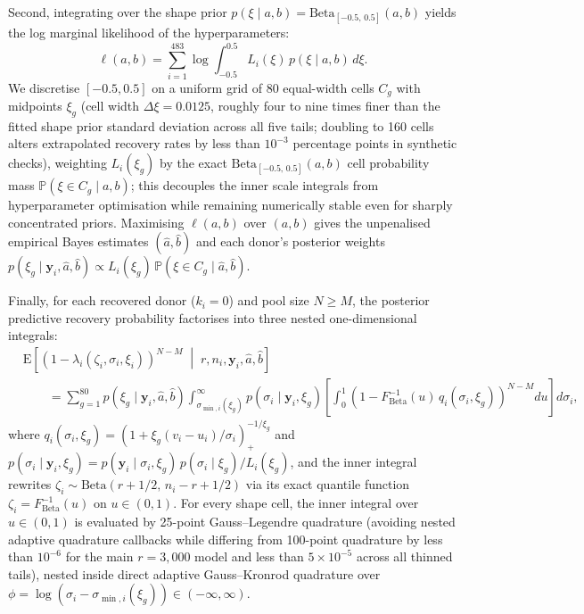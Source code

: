 \documentclass[11pt,a4paper]{article}
\begin{document}
Second, integrating over the shape prior $p(\xi \mid a, b) = \mathrm{Beta}_{[-0.5,\,0.5]}(a, b)$ yields the log marginal likelihood of the hyperparameters:
\[
    \ell(a, b) = \sum_{i=1}^{483} \log \int_{-0.5}^{0.5} L_i(\xi)\, p(\xi \mid a, b)\, d\xi.
\]
We discretise $[-0.5, 0.5]$ on a uniform grid of 80 equal-width cells $C_g$ with midpoints $\xi_g$ (cell width $\Delta\xi = 0.0125$, roughly four to nine times finer than the fitted shape prior standard deviation across all five tails; doubling to 160 cells alters extrapolated recovery rates by less than $10^{-3}$ percentage points in synthetic checks), weighting $L_i(\xi_g)$ by the exact $\mathrm{Beta}_{[-0.5,\,0.5]}(a, b)$ cell probability mass $\mathbb{P}(\xi \in C_g \mid a, b)$; this decouples the inner scale integrals from hyperparameter optimisation while remaining numerically stable even for sharply concentrated priors. Maximising $\ell(a, b)$ over $(a, b)$ gives the unpenalised empirical Bayes estimates $(\hat{a}, \hat{b})$ and each donor's posterior weights $p(\xi_g \mid \mathbf{y}_i, \hat{a}, \hat{b}) \propto L_i(\xi_g)\,\mathbb{P}(\xi \in C_g \mid \hat{a}, \hat{b})$.

Finally, for each recovered donor ($k_i = 0$) and pool size $N \ge M$, the posterior predictive recovery probability factorises into three nested one-dimensional integrals:
\begin{align*}
    &\mathrm{E}\!\left[\left(1 - \lambda_i(\zeta_i, \sigma_i, \xi_i)\right)^{N - M} \;\middle|\; r, n_i, \mathbf{y}_i, \hat{a}, \hat{b}\right] \\
    &\qquad = \sum_{g=1}^{80} p(\xi_g \mid \mathbf{y}_i, \hat{a}, \hat{b}) \int_{\sigma_{\min,i}(\xi_g)}^{\infty} p(\sigma_i \mid \mathbf{y}_i, \xi_g) \left[\int_{0}^{1} \left(1 - F_{\mathrm{Beta}}^{-1}(u)\, q_i(\sigma_i, \xi_g)\right)^{N - M}\! du\right] d\sigma_i,
\end{align*}
where $q_i(\sigma_i, \xi_g) = (1 + \xi_g (v_i - u_i)/\sigma_i)_{+}^{-1/\xi_g}$ and $p(\sigma_i \mid \mathbf{y}_i, \xi_g) = p(\mathbf{y}_i \mid \sigma_i, \xi_g)\, p(\sigma_i \mid \xi_g) / L_i(\xi_g)$, and the inner integral rewrites $\zeta_i \sim \mathrm{Beta}(r + 1/2,\, n_i - r + 1/2)$ via its exact quantile function $\zeta_i = F_{\mathrm{Beta}}^{-1}(u)$ on $u \in (0, 1)$. For every shape cell, the inner integral over $u \in (0, 1)$ is evaluated by 25-point Gauss--Legendre quadrature (avoiding nested adaptive quadrature callbacks while differing from 100-point quadrature by less than $10^{-6}$ for the main $r = 3{,}000$ model and less than $5\times 10^{-5}$ across all thinned tails), nested inside direct adaptive Gauss--Kronrod quadrature over $\phi = \log(\sigma_i - \sigma_{\min,i}(\xi_g)) \in (-\infty, \infty)$.
\end{document}
